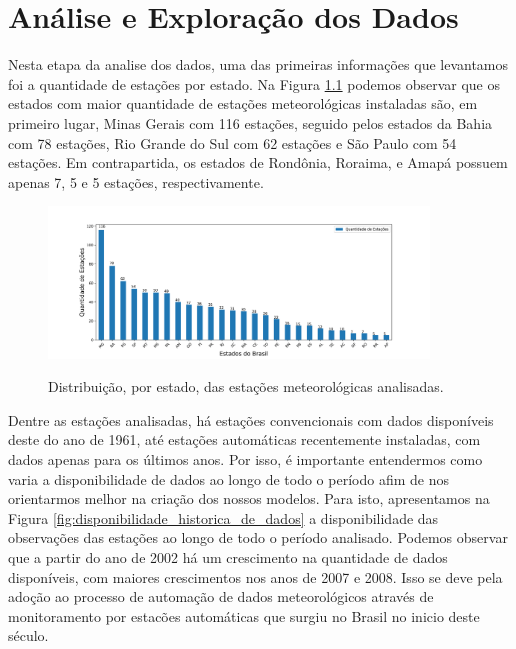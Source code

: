 \chapter{Análise e Exploração dos Dados}

Nesta etapa da analise dos dados, uma das primeiras informações que levantamos foi a quantidade de estações por estado. Na Figura \ref{fig:estacoes_por_estado} podemos observar que os estados com maior quantidade de estações meteorológicas instaladas são, em primeiro lugar, Minas Gerais com 116 estações, seguido pelos estados da Bahia com 78 estações,  Rio Grande do Sul com 62 estações e São Paulo com 54 estações. Em contrapartida, os estados de Rondônia,  Roraima, e Amapá possuem apenas 7, 5 e 5 estações, respectivamente.  

\begin{figure}[H]
    \centering
    \caption{Distribuição, por estado, das estações meteorológicas analisadas.}
    \includegraphics[width=0.9\textwidth]{figuras/estacoes_por_estado.png}
    \label{fig:estacoes_por_estado}
\end{figure}

Dentre as estações analisadas, há estações convencionais com dados disponíveis deste do ano de 1961, até estações automáticas recentemente instaladas, com dados apenas para os últimos anos. Por isso, é importante entendermos como varia a disponibilidade de dados ao longo de todo o período afim de nos orientarmos melhor na criação dos nossos modelos. Para isto, apresentamos na Figura \ref{fig:disponibilidade_historica_de_dados} a disponibilidade das observações das estações ao longo de todo o período analisado. Podemos observar que a partir do ano de 2002 há um crescimento na quantidade de dados disponíveis, com maiores crescimentos nos anos de 2007 e 2008. Isso se deve pela adoção ao processo de automação de dados meteorológicos através de monitoramento por estacões automáticas que surgiu no Brasil no inicio deste século.  

